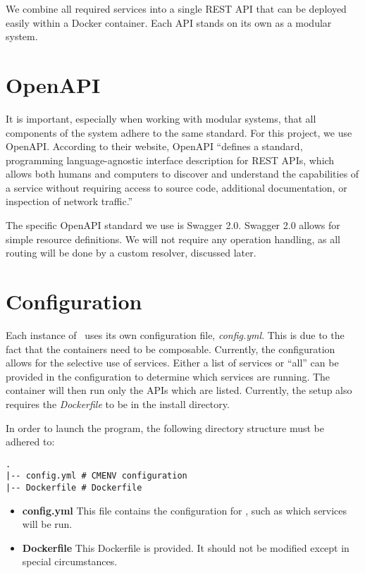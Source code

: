 We combine all required services into a single REST API that can be deployed
easily within a Docker container. Each API stands on its own as a modular
system.

\section{OpenAPI}

It is important, especially when working with modular systems, that all
components of the system adhere to the same standard. For this project,
we use OpenAPI. According to their website, OpenAPI ``defines a standard,
programming language-agnostic interface description for REST APIs, which allows
both humans and computers to discover and understand the capabilities of a
service without requiring access to source code, additional documentation,
or inspection of network traffic.''\cite{hid-sp18-526-www-openapi}

The specific OpenAPI standard we use is Swagger 2.0. Swagger 2.0 allows for
simple resource definitions. We will not require any operation handling,
as all routing will be done by a custom resolver, discussed later.

\section{Configuration}

Each instance of \projectname~uses its own configuration file,
\textit{config.yml}. This is due to the fact that the containers need to
be composable. Currently, the configuration allows for the selective use
of services. Either a list of services or ``all'' can be provided in the
configuration to determine which services are running. The container will
then run only the APIs which are listed. Currently, the setup also requires
the \textit{Dockerfile} to be in the install directory.

In order to launch the program, the following directory structure must be
adhered to:
\begin{verbatim}
.
|-- config.yml # CMENV configuration
|-- Dockerfile # Dockerfile

\end{verbatim}
\begin{itemize}
    \item \textbf{config.yml} This file contains the configuration for
    \projectname, such as which services will be run.
    \item \textbf{Dockerfile} This Dockerfile is provided. It should not be
    modified except in special circumstances.
\end{itemize}

